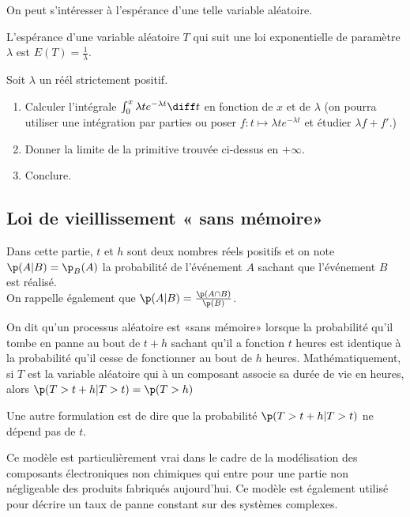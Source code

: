\documentclass[11pt,a4paper,french]{article}
\begin{document}
On peut s'intéresser à l'espérance d'une telle variable aléatoire.

\begin{proposition}
  L'espérance d'une variable aléatoire $T$ qui suit une loi
  exponentielle de paramètre $\lambda$ est $E(T) = \frac1{\lambda}$.
\end{proposition}

\begin{question}
  Soit $\lambda$ un réél strictement positif.
  \begin{enumerate}
    \item Calculer l'intégrale $\int_0^x \lambda te^{-\lambda t} \diff
      t$ en fonction de $x$ et de $\lambda$ (on pourra utiliser une
        intégration par parties ou poser $f:t\mapsto \lambda
        te^{-\lambda t}$ et étudier $\lambda f + f'$.)
    \item Donner la limite de la primitive trouvée ci-dessus en
      $+\infty$.
    \item Conclure.
  \end{enumerate}
\end{question}

\subsection{Loi de vieillissement « sans mémoire»}

Dans cette partie, $t$ et $h$ sont deux nombres réels positifs et on
note $\p(A | B) = \p_B(A)$ la probabilité de l'événement $A$ sachant que
l'événement $B$ est réalisé.\\
On rappelle également que $\p(A | B) = \frac{\p(A\cap B)}{\p(B)}$.

\begin{definition}
  On dit qu'un processus aléatoire est «sans mémoire» lorsque la
  probabilité qu'il tombe en panne au bout de $t+h$ sachant qu'il a
  fonction $t$ heures est identique à la probabilité qu'il cesse de
  fonctionner au bout de $h$ heures. Mathématiquement, si $T$ est la
  variable aléatoire qui à un composant associe sa durée de vie en
  heures, alors $\p(T > t+h | T > t) = \p(T > h)$
\end{definition}

Une autre formulation est de dire que la probabilité $\p(T > t+h | T >
t)$ ne dépend pas de $t$.

Ce modèle est particulièrement vrai dans le cadre de la modélisation des
composants électroniques non chimiques qui entre pour une partie non
négligeable des produits fabriqués aujourd'hui. Ce modèle est également
utilisé pour décrire un taux de panne constant sur des systèmes
complexes.
\end{document}
